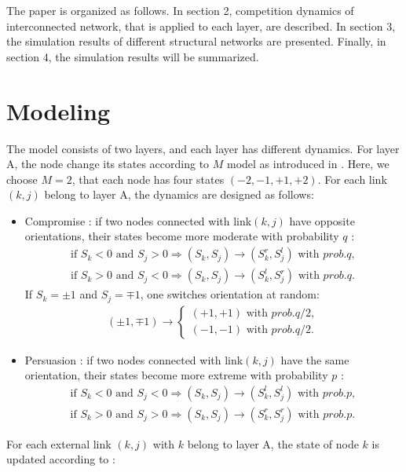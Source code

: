 \documentclass[english]{cccconf}
\begin{document}
The paper is organized as follows. In section 2, competition dynamics of interconnected network, that is applied to each layer, are described. In section 3, the simulation results of different structural networks are presented. Finally, in section 4, the simulation results will be summarized.

\section{Modeling}
The model consists of two layers, and each layer has different dynamics. For layer A, the node change its states according to $M$ model as introduced in \cite{rocca2014}. Here, we choose $M=2$, that each node has four states $(-2, -1, +1, +2)$. For each link $(k, j)$ belong to layer A,  the dynamics are designed as follows:
\begin{itemize}
\item Compromise : if two nodes connected with link$(k, j)$ have opposite orientations, their states become more moderate with probability $q$ :
\begin{align*}
\mbox{if } S_k<0 \mbox{ and } S_j>0  \Rightarrow (S_k, S_j) \rightarrow (S_k^r, S_j^l) \mbox{ with } prob.q,\\
\mbox{if } S_k>0 \mbox{ and } S_j<0  \Rightarrow (S_k, S_j) \rightarrow (S_k^l, S_j^r) \mbox{ with } prob.q.
\end{align*}
If $S_k = \pm1$ and $S_j = \mp1$, one switches orientation at random:
\begin{align*}
(\pm 1, \mp 1)\rightarrow \left\{\begin{matrix}
(+1, +1) \mbox{ with } prob.q/2,
\\(-1, -1)\mbox{ with } prob.q/2.
\end{matrix}\right.
\end{align*}
\item Persuasion : if two nodes connected with link$(k, j)$ have the same orientation, their states become more extreme with probability $p$ :
\begin{align*}
\mbox{if } S_k<0 \mbox{ and } S_j<0  \Rightarrow (S_k, S_j) \rightarrow (S_k^l, S_j^l) \mbox{ with } prob.p,\\
\mbox{if } S_k>0 \mbox{ and } S_j>0  \Rightarrow (S_k, S_j) \rightarrow (S_k^r, S_j^r) \mbox{ with } prob.p.
\end{align*}
\end{itemize}
For each external link $(k,j)$ with $k$ belong to layer A, the state of node $k$ is updated according to :
\end{document}
